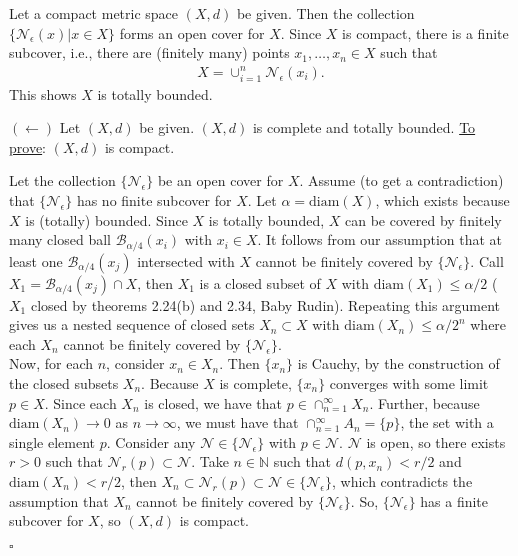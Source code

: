 \documentclass[11pt]{article}
\begin{document}
\begin{enumerate}
\begin{itemize}
		Let a compact metric space $(X,d)$ be given. Then the collection $\{\mathcal{N}_\epsilon(x) | x\in X\}$ forms an open cover for $X$. Since $X$ is compact, there is a finite subcover, i.e., there are (finitely many) points $x_1,\dots,x_n \in X$ such that 
		\begin{align*} 
		X = \cup^n_{i=1} \mathcal{N}_\epsilon(x_i).
		\end{align*}
		This shows $X$ is totally bounded. 
	\end{itemize}
	
	$(\leftarrow)$ Let $(X,d)$ be given. $(X,d)$ is complete and totally bounded. \underline{To prove}: $(X,d)$ is compact. 
	
	Let the collection $\{\mathcal{N}_\epsilon\}$ be an open cover for $X$. Assume (to get a contradiction) that $\{\mathcal{N}_\epsilon \}$ has no finite subcover for $X$. Let $\alpha = \text{diam}(X)$, which exists because $X$ is (totally) bounded. Since $X$ is totally bounded, $X$ can be covered by finitely many closed ball $\mathcal{B}_{\alpha/4}(x_i)$ with $x_i \in X$. It follows from our assumption that at least one $\mathcal{B}_{\alpha/4}(x_j)$ intersected with $X$ cannot be finitely covered by $\{\mathcal{N}_\epsilon\}$. Call $X_1 = \mathcal{B}_{\alpha/4}(x_j) \cap X$, then $X_1$ is a closed subset of $X$ with $\text{diam}(X_1) \leq \alpha/2$ ($X_1$ closed by theorems 2.24(b) and 2.34, Baby Rudin). Repeating this argument gives us a nested sequence of closed sets $X_n \subset X$ with $\text{diam}(X_n) \leq \alpha/2^n$ where each $X_n$ cannot be finitely covered by $\{\mathcal{N}_\epsilon\}$. \\
	
	Now, for each $n$, consider $x_n \in X_n$. Then $\{x_n\}$ is Cauchy, by the construction of the closed subsets $X_n$. Because $X$ is complete, $\{x_n\}$ converges with some limit $p \in X$. Since each $X_n$ is closed, we have that $p \in \cap^\infty_{n=1}X_n$. Further, because $\text{diam}(X_n) \to 0$ as $n\to \infty$, we must have that $\cap^\infty_{n=1}A_n = \{p\}$, the set with a single element $p$. Consider any $\mathcal{N} \in \{\mathcal{N}_\epsilon\}$ with $p\in \mathcal{N}$. $\mathcal{N}$ is open, so there exists $r > 0$ such that $\mathcal{N}_r(p) \subset \mathcal{N}$. Take $n\in \mathbb{N}$ such that $d(p,x_n) < r/2$ and $\text{diam}(X_n) < r/2$, then $X_n \subset \mathcal{N}_r(p) \subset \mathcal{N} \in\{\mathcal{N}_\epsilon\}$, which contradicts the assumption that $X_n$ cannot be finitely covered by $\{\mathcal{N}_\epsilon\}$. So, $\{\mathcal{N}_\epsilon\}$ has a finite subcover for $X$, so $(X,d)$ is compact.
	
	 \hfill $\square$       
\end{enumerate}
\end{document}
